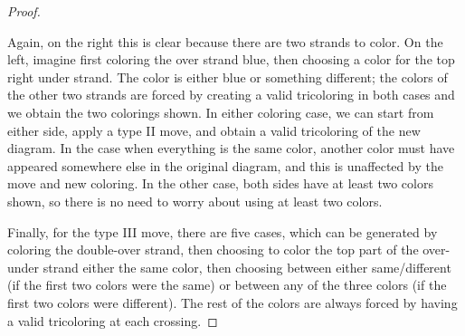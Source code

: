 \documentclass{article}
\theoremstyle{definition}
\theoremstyle{remark}
\begin{document}
\begin{proof}
\begin{center}
	\end{center}
	
	Again, on the right this is clear because there are two strands to color. On the left, imagine first coloring the over strand blue, then choosing a color for the top right under strand. The color is either blue or something different; the colors of the other two strands are forced by creating a valid tricoloring in both cases and we obtain the two colorings shown. In either coloring case, we can start from either side, apply a type II move, and obtain a valid tricoloring of the new diagram. In the case when everything is the same color, another color must have appeared somewhere else in the original diagram, and this is unaffected by the move and new coloring. In the other case, both sides have at least two colors shown, so there is no need to worry about using at least two colors.
	
	Finally, for the type III move, there are five cases, which can be generated by coloring the double-over strand, then choosing to color the top part of the over-under strand either the same color, then choosing between either same/different (if the first two colors were the same) or between any of the three colors (if the first two colors were different). The rest of the colors are always forced by having a valid tricoloring at each crossing.

\newcommand{\reidIIIleft}[6]{
	\begin{scope}
		\clip (0,3) -- (2,1) -- (2,3) -- cycle;
		\draw[very thick, #4] (1,0) -- (1,3);
	\end{scope}
	\begin{scope}
		\clip (0,3) -- (1.5,1.5) -- (0,0) -- cycle;
		\draw[very thick, #5] (1,0) -- (1,3);
	\end{scope}
	\begin{scope}
		\clip (0,0) -- (2,2) -- (2,0) -- cycle;
		\draw[very thick, #6] (1,0) -- (1,3);
	\end{scope}
	
	\draw[line width=4, white] (0,3) -- (2,1);
	\begin{scope}
		\clip (-0.1,0) -- (2.1,2) -- (2.1,3.1) -- (-0.1,3.1) -- cycle;
		\draw[very thick, #2] (0,3) -- (2,1);
	\end{scope}
	\begin{scope}
		\clip (0,0) -- (2.1,2) -- (2.1,0) -- cycle;
		\draw[very thick, #3] (0,3) -- (2,1);
	\end{scope}
	
}
\end{proof}
\end{document}
